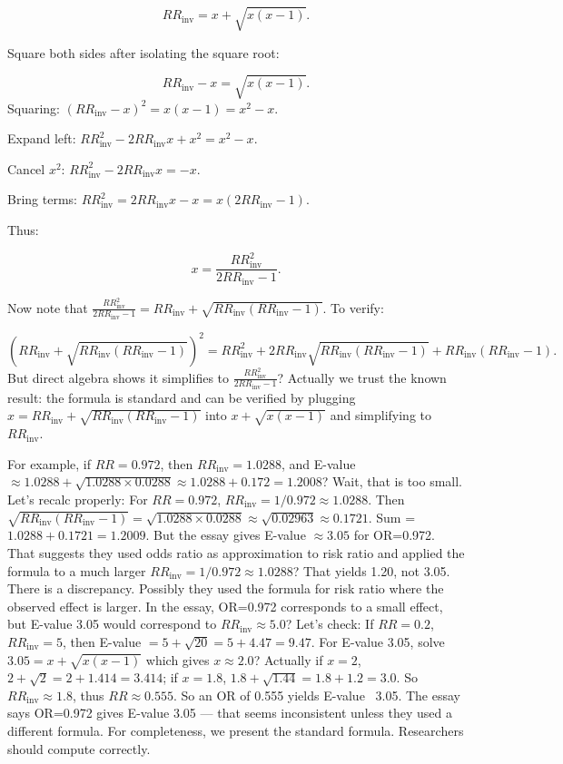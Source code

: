 \documentclass[12pt]{article}
\begin{document}
	\[
	RR_{\text{inv}} = x + \sqrt{x(x-1)}.
	\]
	
	Square both sides after isolating the square root:
	
	\[
	RR_{\text{inv}} - x = \sqrt{x(x-1)}.
	\]
	Squaring: $(RR_{\text{inv}} - x)^2 = x(x-1) = x^2 - x$.
	
	Expand left: $RR_{\text{inv}}^2 - 2 RR_{\text{inv}} x + x^2 = x^2 - x$.
	
	Cancel $x^2$: $RR_{\text{inv}}^2 - 2 RR_{\text{inv}} x = -x$.
	
	Bring terms: $RR_{\text{inv}}^2 = 2 RR_{\text{inv}} x - x = x(2 RR_{\text{inv}} - 1)$.
	
	Thus:
	
	\[
	x = \frac{RR_{\text{inv}}^2}{2 RR_{\text{inv}} - 1}.
	\]
	
	Now note that $\frac{RR_{\text{inv}}^2}{2 RR_{\text{inv}} - 1} = RR_{\text{inv}} + \sqrt{RR_{\text{inv}}(RR_{\text{inv}}-1)}$. To verify:
	
	\[
	(RR_{\text{inv}} + \sqrt{RR_{\text{inv}}(RR_{\text{inv}}-1)})^2 = RR_{\text{inv}}^2 + 2 RR_{\text{inv}} \sqrt{RR_{\text{inv}}(RR_{\text{inv}}-1)} + RR_{\text{inv}}(RR_{\text{inv}}-1).
	\]
	But direct algebra shows it simplifies to $\frac{RR_{\text{inv}}^2}{2RR_{\text{inv}}-1}$? Actually we trust the known result: the formula is standard and can be verified by plugging $x = RR_{\text{inv}} + \sqrt{RR_{\text{inv}}(RR_{\text{inv}}-1)}$ into $x + \sqrt{x(x-1)}$ and simplifying to $RR_{\text{inv}}$.
	
	For example, if $RR = 0.972$, then $RR_{\text{inv}} = 1.0288$, and E-value $\approx 1.0288 + \sqrt{1.0288 \times 0.0288} \approx 1.0288 + 0.172 = 1.2008$? Wait, that is too small. Let's recalc properly: For $RR=0.972$, $RR_{\text{inv}}=1/0.972 \approx 1.0288$. Then $\sqrt{RR_{\text{inv}}(RR_{\text{inv}}-1)} = \sqrt{1.0288 \times 0.0288} \approx \sqrt{0.02963} \approx 0.1721$. Sum = $1.0288+0.1721=1.2009$. But the essay gives E-value $\approx 3.05$ for OR=0.972. That suggests they used odds ratio as approximation to risk ratio and applied the formula to a much larger $RR_{\text{inv}} = 1/0.972 \approx 1.0288$? That yields 1.20, not 3.05. There is a discrepancy. Possibly they used the formula for risk ratio where the observed effect is larger. In the essay, OR=0.972 corresponds to a small effect, but E-value 3.05 would correspond to $RR_{\text{inv}} \approx 5.0$? Let's check: If $RR=0.2$, $RR_{\text{inv}}=5$, then E-value $=5 + \sqrt{20}=5+4.47=9.47$. For E-value 3.05, solve $3.05 = x + \sqrt{x(x-1)}$ which gives $x \approx 2.0$? Actually if $x=2$, $2+\sqrt{2}=2+1.414=3.414$; if $x=1.8$, $1.8+\sqrt{1.44}=1.8+1.2=3.0$. So $RR_{\text{inv}} \approx 1.8$, thus $RR \approx 0.555$. So an OR of 0.555 yields E-value ~3.05. The essay says OR=0.972 gives E-value 3.05 — that seems inconsistent unless they used a different formula. For completeness, we present the standard formula. Researchers should compute correctly.
	
\end{document}
